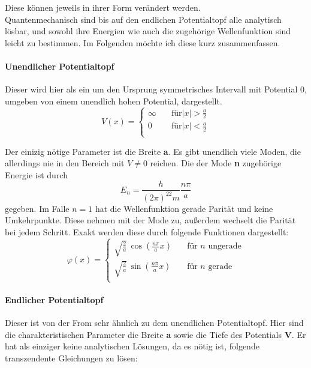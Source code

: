 \documentclass[12pt,twoside,a4paper]{book}
\begin{document}
Diese k\"{o}nnen jeweils in ihrer Form verändert werden.
\\Quantenmechanisch sind bis auf den endlichen Potentialtopf alle analytisch l\"{o}sbar, und sowohl ihre
Energien wie auch die zugeh\"{o}rige Wellenfunktion sind leicht zu bestimmen. Im Folgenden m\"{o}chte ich
diese kurz zusammenfassen.



\paragraph{Unendlicher Potentialtopf}Dieser wird hier als ein um den Ursprung symmetrisches Intervall mit Potential 0, umgeben von einem unendlich hohen Potential, dargestellt.
\begin{equation}
V(x) =
\begin{cases}
\infty & \quad \text{f\"{u}r} |x|>\frac{a}{2}\\
0 & \quad \text{f\"{u}r} |x|<\frac{a}{2}\\
\end{cases}
\end{equation}

Der einizig n\"{o}tige Parameter ist die Breite \textbf{a}. Es gibt unendlich viele Moden, die allerdings nie in den Bereich mit \(V \neq 0\) reichen. Die der Mode \textbf{n} zugeh\"{o}rige Energie ist durch
\begin{equation}E_n=\frac{h}{(2\pi)^22m}\frac{n \pi}{a} 
\end{equation}
gegeben. Im Falle \(n = 1\) hat die Wellenfunktion gerade Parit\"{a}t und keine Umkehrpunkte. Diese nehmen mit der Mode zu, außerdem wechselt die Parit\"{a}t bei jedem Schritt. Exakt werden diese durch
folgende Funktionen dargestellt:
\begin{equation} \varphi(x) = 
\begin{cases}
\sqrt{\frac{2}{a}} \, \cos(\frac{n\pi}{a}x) & \quad \text{für } n \text{ ungerade}\\
\sqrt{\frac{2}{a}} \, \sin(\frac{n\pi}{a}x) & \quad \text{für } n \text{ gerade}\\
\end{cases}
\end{equation}



\paragraph{Endlicher Potentialtopf}Dieser ist von der From sehr \"{a}hnlich zu dem unendlichen Potentialtopf. Hier sind die charakteristischen Parameter die Breite \textbf{a} sowie die Tiefe des Potentials \textbf{V}. Er hat als einziger keine analytischen L\"{o}sungen, da es n\"{o}tig ist, folgende transzendente Gleichungen zu l\"{o}sen:
\end{document}
